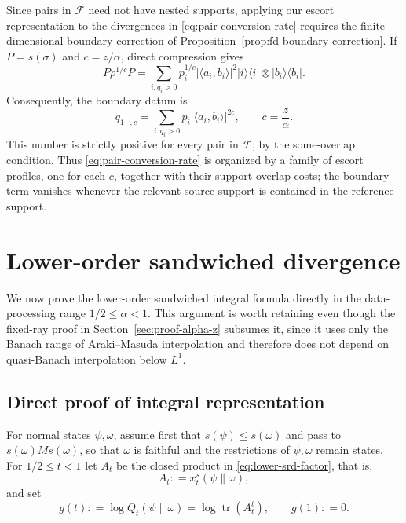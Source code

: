 \documentclass[12pt]{article}
\numberwithin{equation}{section}
\theoremstyle{definition}
\theoremstyle{remark}
\newcommand{\?}{\overset{?}{=}}
\newcommand{\defeq}{\mathrel{\mathop:}=}
\DeclareMathOperator{\tr}{tr}
\begin{document}
Since pairs in \(\mathcal F\) need not have nested supports, applying our
escort representation to the divergences in
\eqref{eq:pair-conversion-rate} requires the finite-dimensional boundary
correction of Proposition~\ref{prop:fd-boundary-correction}.  If $P=s(\sigma)$ and
$c=z/\alpha$, direct compression gives
\[
  P\rho^{1/c}P
  =\sum_{i:q_i>0}p_i^{1/c}|\langle a_i,b_i\rangle|^2
    |i\rangle\!\langle i|\otimes|b_i\rangle\!\langle b_i|.
\]
Consequently, the boundary datum is
\begin{equation}
  q_{1-,c}
  =\sum_{i:q_i>0}p_i\lvert\langle a_i,b_i\rangle\rvert^{2c},
  \qquad c=\frac z\alpha.
  \label{eq:cq-boundary-datum}
\end{equation}
This number is strictly positive for every pair in $\mathcal F$, by the
some-overlap condition.  Thus \eqref{eq:pair-conversion-rate} is organized
by a family of escort profiles, one for each $c$, together with their
support-overlap costs; the boundary term vanishes whenever the relevant
source support is contained in the reference support.

\section{Lower-order sandwiched divergence}
\label{sec:proof-lower-srd}

We now prove the lower-order sandwiched integral formula directly in the
data-processing range $1/2\leq\alpha<1$.  This argument is worth retaining
even though the fixed-ray proof in Section~\ref{sec:proof-alpha-z}
subsumes it, since it uses only the Banach range of Araki--Masuda interpolation
\cite{Berta:2016vnw,Jencova:2017txf} and therefore does not depend
on quasi-Banach interpolation below $L^1$.

\subsection{Direct proof of integral representation}

For normal states $\psi, \omega$, assume first that $s(\psi)\leq s(\omega)$ and pass to
$s(\omega)Ms(\omega)$, so that $\omega$ is faithful and the restrictions of $\psi,\omega$ remain states.  For
$1/2\leq t<1$ let $A_t$ be the closed product in
\eqref{eq:lower-srd-factor}, that is,
\begin{equation}
    A_t\defeq x_t^s(\psi\|\omega),
\end{equation}
and set
\begin{equation}
  g(t)\defeq \log Q_t(\psi\|\omega)
       =\log\tr(A_t^t),
  \qquad g(1)\defeq 0.
  \label{eq:lower-proof-g}
\end{equation}
\end{document}
